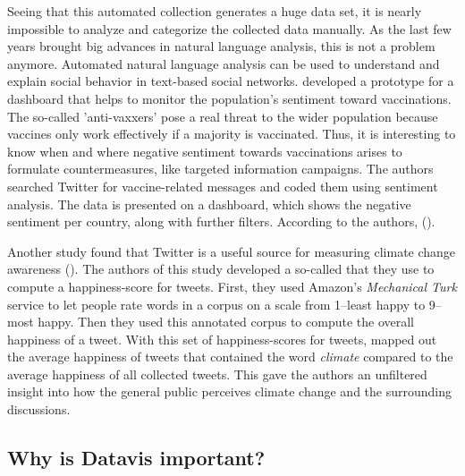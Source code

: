 Seeing that this automated collection generates a huge data set, it is nearly impossible to analyze and categorize the collected data manually. As the last few years brought big advances in natural language analysis, this is not a problem anymore. Automated natural language analysis can be used to understand and explain social behavior in text-based social networks. \citeauthor{bahk2016publicly} developed a prototype for a dashboard that helps to monitor the population's sentiment toward vaccinations. The so-called 'anti-vaxxers' pose a real threat to the wider population because vaccines only work effectively if a majority is vaccinated. Thus, it is interesting to know when and where negative sentiment towards vaccinations arises to formulate countermeasures, like targeted information campaigns. The authors searched Twitter for vaccine-related messages and coded them using sentiment analysis. The data is presented on a dashboard, which shows the negative sentiment per country, along with further filters. According to the authors,  (\cite[343]{bahk2016publicly}).

Another study found that Twitter is a useful source for measuring climate change awareness (\cite{codyClimateChangeSentiment2015}). The authors of this study developed a so-called  that they use to compute a happiness-score for tweets. First, they used Amazon's \emph{Mechanical Turk} service to let people rate words in a corpus on a scale from 1--least happy to 9--most happy. Then they used this annotated corpus to compute the overall happiness of a tweet. With this set of happiness-scores for tweets, \citeauthor{codyClimateChangeSentiment2015} mapped out the average happiness of tweets that contained the word \emph{climate} compared to the average happiness of all collected tweets. This gave the authors an unfiltered insight into how the general public perceives climate change and the surrounding discussions.


\subsection{Why is Datavis important?}

